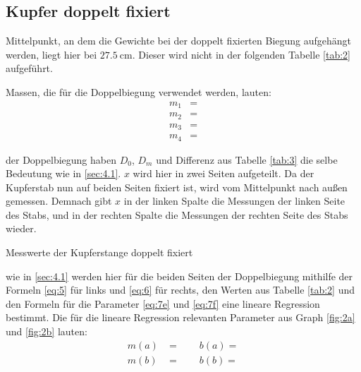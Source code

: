 
\subsection{Kupfer doppelt fixiert}\label{sec:4.2}

\justifying Mittelpunkt, an dem die Gewichte bei der doppelt fixierten Biegung aufgehängt werden, liegt hier bei 
$\SI{27.5}{\centi\meter}$. Dieser wird nicht in der folgenden Tabelle \ref{tab:2} aufgeführt.

\justifying Massen, die für die Doppelbiegung verwendet werden, lauten:
\begin{subequations}\label{eq:}
\begin{align}
    m_1 &= \text{} \label{eq:a}\\
    m_2 &= \text{} \label{eq:b}\\
    m_3 &= \text{} \label{eq:c}\\
    m_4 &= \text{} \label{eq:d}
\end{align}
\end{subequations}

\justifying der Doppelbiegung haben $D_0$, $D_m$ und Differenz aus Tabelle \ref{tab:3} die selbe Bedeutung wie in \ref{sec:4.1}.
$x$ wird hier in zwei Seiten aufgeteilt. Da der Kupferstab nun auf beiden Seiten fixiert ist, wird vom Mittelpunkt nach außen gemessen. Demnach
gibt $x$ in der linken Spalte die Messungen der linken Seite des Stabs, und in der rechten Spalte die Messungen der rechten Seite des Stabs wieder.
\begin{table}[H]
    \centering
    
    \caption{Messwerte der Kupferstange doppelt fixiert}
    \label{tab:3}
\end{table}

\justifying wie in \ref{sec:4.1} werden hier für die beiden Seiten der Doppelbiegung mithilfe der Formeln \eqref{eq:5} für
links und \eqref{eq:6} für rechts, den Werten aus Tabelle \ref{tab:2} und den Formeln für die Parameter \eqref{eq:7e} und \eqref{eq:7f} eine 
lineare Regression bestimmt. Die für die lineare Regression relevanten Parameter aus Graph \ref{fig:2a} und \ref{fig:2b} lauten:
\begin{subequations}\label{eq:}
\begin{align}
    m(a) &= \text{} \qquad
    b(a) = \text{}\label{eq:a}\\
    m(b) &= \text{} \qquad
    b(b) = \text{}\label{eq:b}
\end{align}
\end{subequations}


